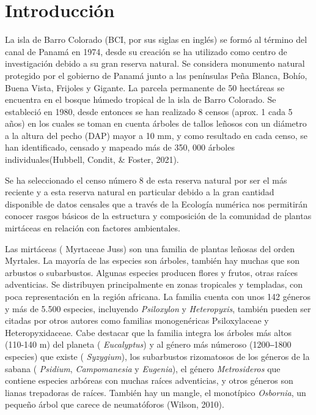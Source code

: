 \documentclass[11pt,]{article}
\begin{document}
\vskip 6.5pt


\noindent  \section{Introducción}\label{introducciuxf3n}

La isla de Barro Colorado (BCI, por sus siglas en inglés) se formó al
término del canal de Panamá en 1974, desde su creación se ha utilizado
como centro de investigación debido a su gran reserva natural. Se
considera monumento natural protegido por el gobierno de Panamá junto a
las penínsulas Peña Blanca, Bohío, Buena Vista, Frijoles y Gigante. La
parcela permanente de 50 hectáreas se encuentra en el bosque húmedo
tropical de la isla de Barro Colorado. Se estableció en 1980, desde
entonces se han realizado 8 censos (aprox. 1 cada 5 años) en los cuales
se toman en cuenta árboles de tallos leñosos con un diámetro a la altura
del pecho (DAP) mayor a 10 mm, y como resultado en cada censo, se han
identificado, censado y mapeado más de 350, 000 árboles
individuales(Hubbell, Condit, \& Foster, 2021).

Se ha seleccionado el censo número 8 de esta reserva natural por ser el
más reciente y a esta reserva natural en particular debido a la gran
cantidad disponible de datos censales que a través de la Ecología
numérica nos permitirán conocer rasgos básicos de la estructura y
composición de la comunidad de plantas mirtáceas en relación con
factores ambientales.

Las mirtáceas ( Myrtaceae Juss) son una familia de plantas leñosas del
orden Myrtales. La mayoría de las especies son árboles, también hay
muchas que son arbustos o subarbustos. Algunas especies producen flores
y frutos, otras raíces adventicias. Se distribuyen principalmente en
zonas tropicales y templadas, con poca representación en la región
africana. La familia cuenta con unos 142 géneros y más de 5.500
especies, incluyendo \emph{Psiloxylon} y \emph{Heteropyxis}, también
pueden ser citadas por otros autores como familias monogenéricas
Psiloxylaceae y Heteropyxidaceae. Cabe destacar que la familia integra
los árboles más altos (110-140 m) del planeta ( \emph{Eucalyptus}) y al
género más númeroso (1200‒1800 especies) que existe ( \emph{Syzygium}),
los subarbustos rizomatosos de los géneros de la sabana (
\emph{Psidium}, \emph{Campomanesia} y \emph{Eugenia}), el género
\emph{Metrosideros} que contiene especies arbóreas con muchas raíces
adventicias, y otros géneros son lianas trepadoras de raíces. También
hay un mangle, el monotípico \emph{Osbornia}, un pequeño árbol que
carece de neumatóforos (Wilson, 2010).
\end{document}
